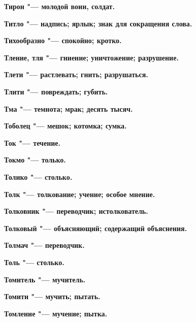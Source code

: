 \bfseries Тирон \normalfont{} "--- молодой воин, солдат. 




\bfseries Титло \normalfont{} "--- надпись; ярлык; знак для сокращения слова. 




\bfseries Тихообразно \normalfont{} "--- спокойно; кротко. 




\bfseries Тление, тля \normalfont{} "--- гниение; уничтожение; разрушение. 




\bfseries Тлети \normalfont{} "--- растлевать; гнить; разрушаться. 




\bfseries Тлити \normalfont{} "--- повреждать; губить. 




\bfseries Тма \normalfont{} "--- темнота; мрак; десять тысяч. 




\bfseries Тоболец \normalfont{} "--- мешок; котомка; сумка. 




\bfseries Ток \normalfont{} "--- течение. 




\bfseries Токмо \normalfont{} "--- только. 




\bfseries Толико \normalfont{} "--- столько. 




\bfseries Толк \normalfont{} "--- толкование; учение; особое мнение. 




\bfseries Толковник \normalfont{} "--- переводчик; истолкователь. 




\bfseries Толковый \normalfont{} "--- объясняющий; содержащий объяснения. 




\bfseries Толмач \normalfont{} "--- переводчик. 




\bfseries Толь \normalfont{} "--- столько. 




\bfseries Томитель \normalfont{} "--- мучитель. 




\bfseries Томити \normalfont{} "--- мучить; пытать. 




\bfseries Томление \normalfont{} "--- мучение; пытка. 




